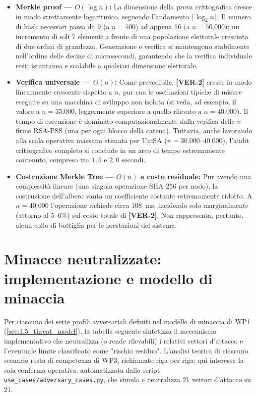 \begin{itemize}
  \item \textbf{Merkle proof --- $O(\log n)$:} La dimensione della prova crittografica cresce in modo strettamente logaritmico, seguendo l'andamento $\lceil\log_2 n\rceil$. Il numero di hash necessari passa da 9 (a $n=500$) ad appena 16 (a $n=50.000$); un incremento di soli 7 elementi a fronte di una popolazione elettorale cresciuta di due ordini di grandezza. Generazione e verifica si mantengono stabilmente nell'ordine delle decine di microsecondi, garantendo che la verifica individuale resti istantanea e scalabile a qualsiasi dimensione elettorale.
  
  \item \textbf{Verifica universale --- $O(n)$:} Come prevedibile, \textbf{[VER-2]} cresce in modo linearmente crescente rispetto a $n$, pur con le oscillazioni tipiche di misure eseguite su una macchina di sviluppo non isolata (si veda, ad esempio, il valore a $n=35.000$, leggermente superiore a quello rilevato a $n=40.000$). Il tempo di esecuzione è dominato computazionalmente dalla verifica delle $n$ firme RSA-PSS (una per ogni blocco della catena). Tuttavia, anche lavorando alla scala operativa massima stimata per UniSA ($n = 30.000$--$40.000$), l'audit crittografico completo si conclude in un arco di tempo estremamente contenuto, compreso tra $1{,}5$ e $2{,}0$ secondi.

  \item \textbf{Costruzione Merkle Tree --- $O(n)$ a costo residuale:} Pur avendo una complessità lineare (una singola operazione SHA-256 per nodo), la costruzione dell'albero vanta un coefficiente costante estremamente ridotto. A $n=40.000$ l'operazione richiede circa $108$~ms, incidendo solo marginalmente (attorno al 5--6\%) sul costo totale di \textbf{[VER-2]}. Non rappresenta, pertanto, alcun collo di bottiglia per le prestazioni del sistema.
\end{itemize}


\section{Minacce neutralizzate: implementazione e modello di minaccia}
\label{sec:wp4_minacce}

Per ciascuno dei sette profili avversariali definiti nel modello di minaccia di WP1 (\ref{sec:1.5_threat_model}), la tabella seguente sintetizza il meccanismo implementativo che neutralizza (o rende rilevabili) i relativi vettori d'attacco e l'eventuale limite classificato come "rischio residuo". L'analisi teorica di ciascuno scenario resta di competenza di WP3, richiamato riga per riga; qui interessa la sola conferma operativa, automatizzata dallo script \texttt{use\_cases/adversary\_cases.py}, che simula e neutralizza 21 vettori d'attacco su 21.

